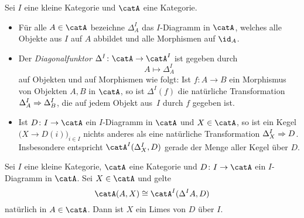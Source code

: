 \begin{thErinnerDef}[Diagonalfunktor]
    \label{ch3:def:diagonalfunktor}
    Sei $I$ eine kleine Kategorie und $\catA$ eine Kategorie.
    \begin{itemize}
        \item 
            Für alle $A\in\catA$ bezeichne $\Delta^I_A$ das $I$-Diagramm in
            $\catA$, welches alle Objekte aus $I$ auf $A$ abbildet und alle
            Morphismen auf $\id_A$.
            
        \item
            Der \emph{Diagonalfunktor $\Delta^I\colon\catA\to\catA^I$} ist 
            gegeben durch
            \[ A\mapsto \Delta^I_A \]
            auf Objekten und auf Morphismen wie folgt: Ist $f\colon A\to B$
            ein Morphismus von Objekten $A,B$ in $\catA$, so ist $\Delta^I(f)$
            die natürliche Transformation $\Delta^I_A \mathrel{\Rightarrow} \Delta^I_B$,
            die auf jedem Objekt aus~$I$ durch $f$ gegeben ist.
            
        \item
            Ist $D\colon I\to\catA$ ein $I$-Diagramm in $\catA$ und $X\in\catA$,
            so ist ein Kegel $\bigl( X \to D(i) \bigr)_{i\in I}$ nichts anderes
            als eine natürliche Transformation $\Delta^I_X \mathrel{\Rightarrow} D$.
            Insbesondere entspricht $\catA^I(\Delta^I_X, D)$ gerade der Menge aller
            Kegel über $D$.
    \end{itemize}
\end{thErinnerDef}

\begin{thLemma}
    \label{ch3:limesviadiagrammkategorie}
    Sei $I$ eine kleine Kategorie, $\catA$ eine Kategorie und $D\colon
    I\to\catA$ ein $I$-Diagramm in $\catA$. Sei $X\in\catA$ und gelte
    \[ \catA(A,X) \cong \catA^I(\Delta^I A, D) \]
    natürlich in $A\in\catA$. Dann ist $X$ ein Limes von $D$ über $I$.
\end{thLemma}

